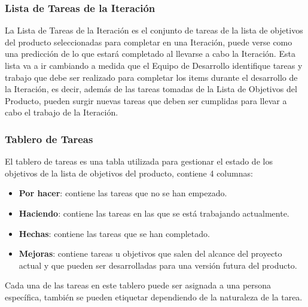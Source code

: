 \subsubsection{Lista de Tareas de la Iteración}
La Lista de Tareas de la Iteración es el conjunto de tareas de la lista de objetivos del producto seleccionadas para completar en una Iteración, puede verse como una predicción de lo que estará completado al llevarse a cabo la Iteración. \cite{scrumSchwaber} Esta lista va a ir cambiando a medida que el Equipo de Desarrollo identifique tareas y trabajo que debe ser realizado para completar los items durante el desarrollo de la Iteración, es decir, además de las tareas tomadas de la Lista de Objetivos del Producto, pueden surgir nuevas tareas que deben ser cumplidas para llevar a cabo el trabajo de la Iteración.

\subsubsection{Tablero de Tareas}
El tablero de tareas es una tabla utilizada para gestionar el estado de los objetivos de la lista de objetivos del producto, contiene 4 columnas:

\begin{itemize}
    \item \textbf{Por hacer}: contiene las tareas que no se han empezado.
    \item \textbf{Haciendo}: contiene las tareas en las que se está trabajando actualmente.
    \item \textbf{Hechas}: contiene las tareas que se han completado.
    \item \textbf{Mejoras}: contiene tareas u objetivos que salen del alcance del proyecto actual y que pueden ser desarrolladas para una versión futura del producto.
\end{itemize}

Cada una de las tareas en este tablero puede ser asignada a una persona específica, también se pueden etiquetar dependiendo de la naturaleza de la tarea.